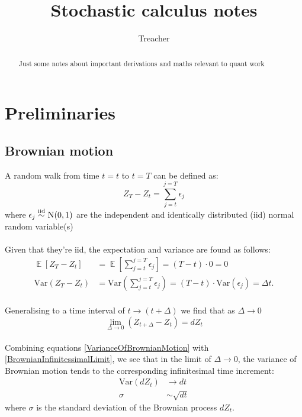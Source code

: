 \documentclass[12pt]{article}
\title{Stochastic calculus notes}
\author{Treacher}
\newcommand{\iid}{\overset{\mathrm{\mathrm{iid}}}{\sim}}
\DeclareMathOperator*{\E}{\mathbb{E}}
\begin{document}
\date{}
\maketitle

\begin{abstract}

\noindent Just some notes about important derivations and maths relevant to quant work

\end{abstract}

\section{Preliminaries}
\subsection{Brownian motion}
A random walk from time $t=t$ to $t=T$ can be defined as:
\begin{equation}
	Z_T-Z_t=\sum\limits_{j=t}^{j=T}\epsilon_j
\end{equation}
where $\epsilon_j\iid\textsc{N}(0,1)$ are the independent and identically distributed (iid) normal random variable(s)\\
\\
Given that they're iid, the expectation and variance are found as follows:
\begin{align}
	\E\left[Z_T-Z_t\right] &= \E\left[\sum\limits_{j=t}^{j=T}\epsilon_j\right]=(T-t)\cdot 0=0\\
	\mathrm{Var}(Z_T-Z_t) &= \mathrm{Var}\left(\sum\limits_{j=t}^{j=T}\epsilon_j\right)=(T-t)\cdot\mathrm{Var}(\epsilon_j) = \Delta t.\label{VarianceOfBrownianMotion}
\end{align}
\\
Generalising to a time interval of $t\rightarrow (t+\Delta)$ we find that as $\Delta\to 0$
\begin{equation}\label{BrownianInfinitessimalLimit}
	\lim\limits_{\Delta\to 0}\left(Z_{t+\Delta} - Z_t\right)=dZ_t
\end{equation}
\\
Combining equations \ref{VarianceOfBrownianMotion} with \ref{BrownianInfinitessimalLimit}, we see that in the limit of $\Delta\to 0$, the variance of Brownian motion tends to the corresponding infinitesimal time increment:
\begin{align}
	\mathrm{Var}(dZ_t)&\to dt \\
	\sigma&\sim\sqrt{dt}
\end{align}
\noindent where $\sigma$ is the standard deviation of the Brownian process $dZ_t$.
\end{document}
